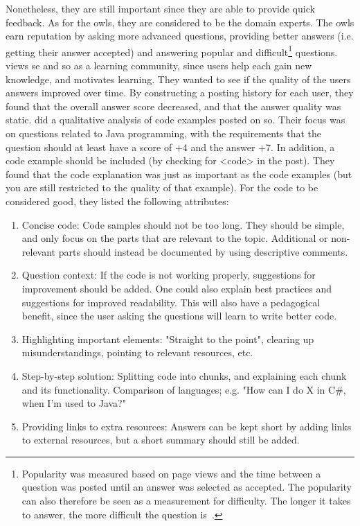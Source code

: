 Nonetheless, they are still important since they are able to provide quick feedback.
As for the owls, they are considered to be the domain experts.
The owls earn reputation by asking more advanced questions, providing better answers (i.e. getting their answer accepted) and answering popular and difficult\footnote{
	Popularity was measured based on page views and the time between a question was posted until an answer was selected as accepted.
	The popularity can also therefore be seen as a measurement for difficulty.
	The longer it takes to answer, the more difficult the question is~\cite[p.~273]{Yang2014}.
} questions.
\vspace{0.5em}\newline
\textcite{Posnett2012} views \gls{se} and \gls{so} as a learning community, since users help each gain new knowledge, and motivates learning.
They wanted to see if the quality of the users answers improved over time. 
By constructing a posting history for each user, they found that the overall answer score decreased, and that the answer quality was static.
\vspace{0.5em}\newline
\textcite{Nasehi2012} did a qualitative analysis of code examples posted on \gls{so}. 
Their focus was on questions related to Java programming, with the requirements that the question should at least have a score of +4 and the answer +7. 
In addition, a code example should be included (by checking for <code> in the post).
They found that the code explanation was just as important as the code examples (but you are still restricted to the quality of that example).
For the code to be considered good, they listed the following attributes: 
\begin{enumerate}
	\item Concise code: Code samples should not be too long. 
	They should be simple, and only focus on the parts that are relevant to the topic.
	Additional or non-relevant parts should instead be documented by using descriptive comments.
	\item Question context: 
	If the code is not working properly, suggestions for improvement should be added. 
	One could also explain best practices and suggestions for improved readability.
	This will also have a pedagogical benefit, since the user asking the questions will learn to write better code.
	\item Highlighting important elements: 
	"Straight to the point", clearing up misunderstandings, pointing to relevant resources, etc.
	\item Step-by-step solution: 
	Splitting code into chunks, and explaining each chunk and its functionality.
	Comparison of languages; e.g. "How can I do X in C\#, when I'm used to Java?"
	\item Providing links to extra resources: 
	Answers can be kept short by adding links to external resources, but a short summary should still be added.
\end{enumerate}


